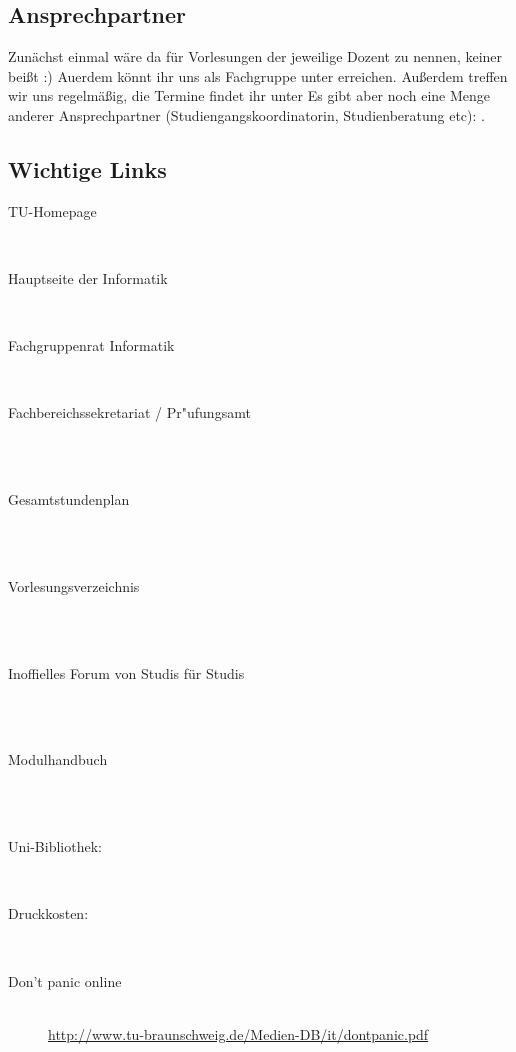\subsection*{Ansprechpartner}
Zunächst einmal wäre da für Vorlesungen der jeweilige Dozent zu nennen,
keiner beißt :) Auerdem könnt ihr uns als Fachgruppe unter
  erreichen. Außerdem treffen wir uns regelmäßig,
die Termine findet ihr unter
Es gibt aber noch eine Menge anderer Ansprechpartner
(Studiengangskoordinatorin, Studienberatung etc):
. 

\subsection*{Wichtige Links}
\begin{description}
  \item[TU-Homepage]~\\
 \item[Hauptseite der Informatik]~\\
 \item[Fachgruppenrat Informatik]~\\
 \item[Fachbereichssekretariat / Pr"ufungsamt]~\\
 \\
\item[Gesamtstundenplan]~\\\\
\item[Vorlesungsverzeichnis]~\\\\
\item[Inoffielles Forum von Studis für
  Studis]~\\\\
\item[Modulhandbuch]~\\\\
\item[Uni-Bibliothek:] ~\\
\item[Druckkosten:] ~\\
\item[Don't panic online] ~\\
{\footnotesize\url{http://www.tu-braunschweig.de/Medien-DB/it/dontpanic.pdf}}
\end{description}

